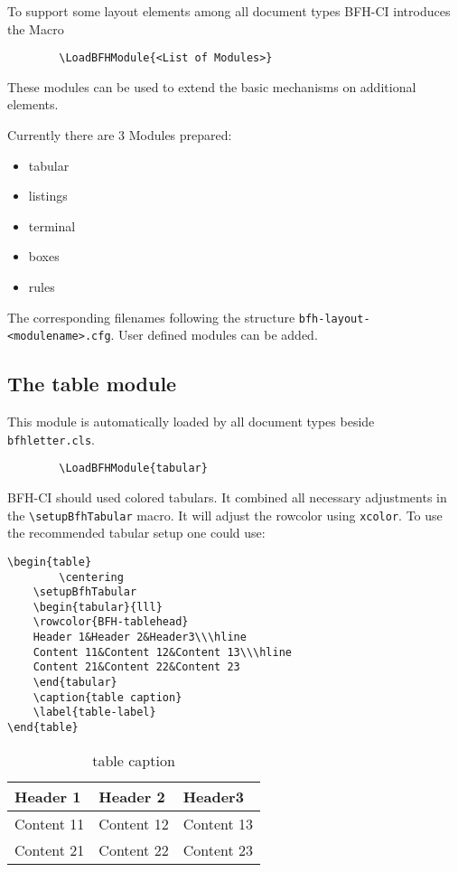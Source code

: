 \documentclass[
]{bfhpub}				%
\newcommand*{\pkg}[1]{\texttt{#1}}
\newcommand*{\cls}[1]{\texttt{#1}}
\newcommand*{\file}[1]{\texttt{#1}}
\begin{document}
To support some layout elements among all document types BFH-CI introduces the Macro
\begin{verbatim}
        \LoadBFHModule{<List of Modules>}
\end{verbatim}

These modules can be used to extend the basic mechanisms on additional elements.

Currently there are 3 Modules prepared:
\begin{itemize}
\item tabular
\item listings
\item terminal
\item boxes
\item rules
\end{itemize}

The corresponding filenames following the structure \file{bfh-layout-<modulename>.cfg}. User defined modules can be added.

\subsection{The table module}

This module is automatically loaded by all document types beside \cls{bfhletter.cls}.

\begin{verbatim}
        \LoadBFHModule{tabular}
\end{verbatim}

BFH-CI should used colored tabulars. It combined all necessary adjustments in the \verb+\setupBfhTabular+ macro. It will adjust the rowcolor using \pkg{xcolor}. To use the recommended tabular setup one could use:

\begin{verbatim}
\begin{table}
        \centering
	\setupBfhTabular
	\begin{tabular}{lll}
	\rowcolor{BFH-tablehead}
	Header 1&Header 2&Header3\\\hline
	Content 11&Content 12&Content 13\\\hline
	Content 21&Content 22&Content 23
	\end{tabular}
	\caption{table caption}
	\label{table-label}
\end{table}
\end{verbatim}

\begin{table}[ht]
	\centering
	\setupBfhTabular
	\begin{tabular}{lll}
		\rowcolor{BFH-tablehead}
		Header 1&Header 2&Header3\\\hline
		Content 11&Content 12&Content 13\\\hline
		Content 21&Content 22&Content 23
	\end{tabular}
	\caption{table caption}
	\label{table-label}
\end{table}
\end{document}
